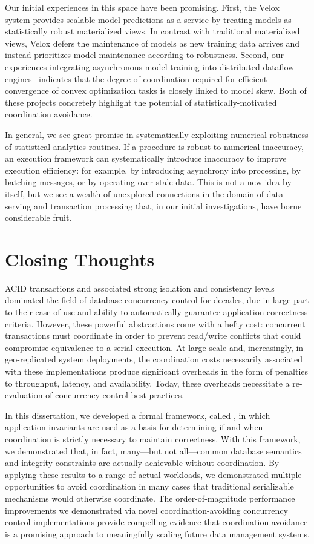 Our initial experiences in this space have been promising. First, the
Velox~\cite{velox-overview} system provides scalable model predictions as a
service by treating models as statistically robust materialized
views. In contrast with traditional materialized views, Velox defers
the maintenance of models as new training data arrives and instead
prioritizes model maintenance according to robustness. Second, our
experiences integrating asynchronous model training into distributed
dataflow engines~\cite{admm} indicates that the degree of coordination
required for efficient convergence of convex optimization tasks is
closely linked to model skew. Both of these projects concretely
highlight the potential of statistically-motivated coordination
avoidance.

In general, we see great promise in systematically exploiting
numerical robustness of statistical analytics routines. If a procedure
is robust to numerical inaccuracy, an execution framework can
systematically introduce inaccuracy to improve execution efficiency:
for example, by introducing asynchrony into processing, by batching
messages, or by operating over stale data. This is not a new idea by
itself, but we see a wealth of unexplored connections in the domain of
data serving and transaction processing that, in our initial
investigations, have borne considerable fruit.

\section{Closing Thoughts}

ACID transactions and associated strong isolation and consistency
levels dominated the field of database concurrency control for
decades, due in large part to their ease of use and ability to
automatically guarantee application correctness criteria. However,
these powerful abstractions come with a hefty cost: concurrent
transactions must coordinate in order to prevent read/write conflicts
that could compromise equivalence to a serial execution. At large
scale and, increasingly, in geo-replicated system deployments, the
coordination costs necessarily associated with these implementations
produce significant overheads in the form of penalties to throughput,
latency, and availability. Today, these overheads necessitate a
re-evaluation of concurrency control best practices.

In this dissertation, we developed a formal framework, called
\iconfluence, in which application invariants are used as a basis for
determining if and when coordination is strictly necessary to maintain
correctness. With this framework, we demonstrated that, in fact,
many---but not all---common database semantics and integrity
constraints are actually achievable without coordination. By applying
these results to a range of actual workloads, we demonstrated multiple
opportunities to avoid coordination in many cases that traditional
serializable mechanisms would otherwise coordinate. The
order-of-magnitude performance improvements we demonstrated via novel
coordination-avoiding concurrency control implementations provide
compelling evidence that coordination avoidance is a promising
approach to meaningfully scaling future data management
systems.

